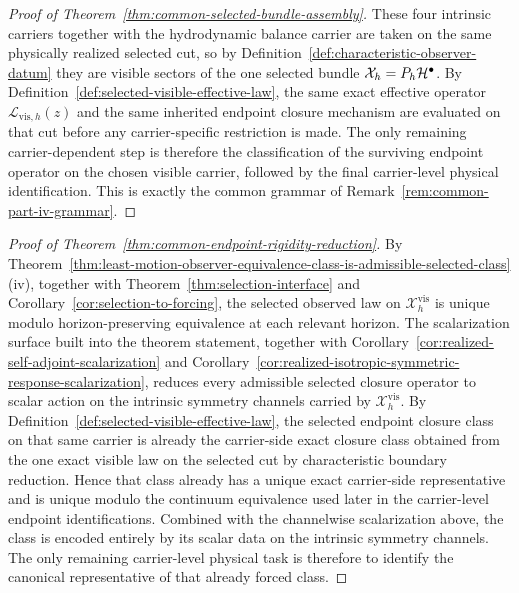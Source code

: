 \begin{proof}[Proof of Theorem~\ref{thm:common-selected-bundle-assembly}]
\label{proof:thm:common-selected-bundle-assembly}
These four intrinsic carriers together with the hydrodynamic balance carrier
are taken on the same physically realized selected cut, so by
Definition~\ref{def:characteristic-observer-datum} they are visible sectors of
the one selected bundle \(\mathcal X_h=P_h\mathcal{H}^\bullet\). By
Definition~\ref{def:selected-visible-effective-law}, the same exact effective
operator \(\mathcal L_{\mathrm{vis},h}(z)\) and the same inherited endpoint
closure mechanism are evaluated on that cut before any carrier-specific
restriction is made. The only remaining carrier-dependent step is therefore the
classification of the surviving endpoint operator on the chosen visible
carrier, followed by the final carrier-level physical identification. This is
exactly the common grammar of Remark~\ref{rem:common-part-iv-grammar}.
\end{proof}

\begin{proof}[Proof of Theorem~\ref{thm:common-endpoint-rigidity-reduction}]
\label{proof:thm:common-endpoint-rigidity-reduction}
By
Theorem~\ref{thm:least-motion-observer-equivalence-class-is-admissible-selected-class}(iv),
together with Theorem~\ref{thm:selection-interface} and
Corollary~\ref{cor:selection-to-forcing}, the selected observed law on
\(\mathcal X_h^{\mathrm{vis}}\) is unique modulo horizon-preserving
equivalence at each relevant horizon. The scalarization surface built into the
theorem statement, together with
Corollary~\ref{cor:realized-self-adjoint-scalarization} and
Corollary~\ref{cor:realized-isotropic-symmetric-response-scalarization},
reduces every admissible selected closure operator to scalar action on the
intrinsic symmetry channels carried by \(\mathcal X_h^{\mathrm{vis}}\). By
Definition~\ref{def:selected-visible-effective-law}, the selected endpoint
closure class on that same carrier is already the carrier-side exact closure
class obtained from the one exact visible law on the selected cut by
characteristic boundary reduction. Hence that class already has a unique exact
carrier-side representative and is unique modulo the continuum equivalence used
later in the carrier-level endpoint identifications. Combined with the
channelwise scalarization above, the class is encoded entirely by its scalar
data on the intrinsic symmetry channels. The only remaining carrier-level
physical task is therefore to identify the canonical representative of that
already forced class.
\end{proof}

